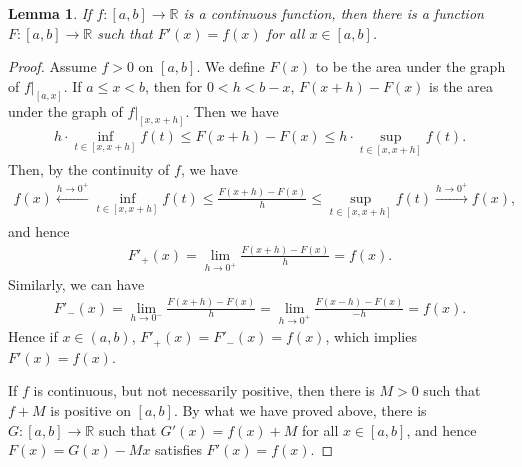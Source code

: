 \documentclass[10pt]{book}
\newtheorem{lemma}{Lemma}[chapter]
\theoremstyle{definition}
\numberwithin{equation}{chapter}
\begin{document}
\begin{lemma}\label{lemma_51}
If $f: [a,b] \to \mathbb{R}$ is a continuous function, then there is a function $F: [a,b] \to \mathbb{R}$ such that $F'(x) = f(x)$ for all $x \in [a,b]$.
\end{lemma}
\begin{proof}
Assume $f > 0$ on $[a,b]$. We define $F(x)$ to be the area under the graph of $f|_{[a,x]}$. If $a \leq x < b$, then for $0 < h < b - x$, $F(x+h) - F(x)$ is the area under the graph of $f|_{[x,x+h]}$. Then we have
\begin{align*}
    h \cdot \inf_{t \in [x,x+h]} f(t) \leq F(x+h) - F(x) \leq h \cdot \sup_{t \in [x,x+h]} f(t).
\end{align*} 
Then, by the continuity of $f$, we have
\begin{align*}
    f(x) \xleftarrow[]{h \to 0^+} \inf_{t \in [x,x+h]} f(t) \leq \frac{F(x+h) - F(x)}{h} \leq \sup_{t \in [x,x+h]} f(t) \xrightarrow[]{h \to 0^+} f(x),
\end{align*}
and hence
\begin{align*}
    F'_+(x) = \lim_{h \to 0^+} \frac{F(x+h) - F(x)}{h} = f(x).
\end{align*}
Similarly, we can have
\begin{align*}
    F'_-(x) = \lim_{h \to 0^-} \frac{F(x+h) - F(x)}{h} = \lim_{h \to 0^+} \frac{F(x-h) - F(x)}{-h} = f(x).
\end{align*}
Hence if $x \in (a,b)$, $F'_+(x) = F'_-(x) = f(x)$, which implies $F'(x) = f(x)$. 

If $f$ is continuous, but not necessarily positive, then there is $M > 0$ such that $f + M$ is positive on $[a,b]$. By what we have proved above, there is $G: [a,b] \to \mathbb{R}$ such that $G'(x) = f(x) + M$ for all $x \in [a,b]$, and hence $F(x) = G(x) - Mx$ satisfies $F'(x) = f(x)$.
\end{proof}

\medskip
\end{document}

